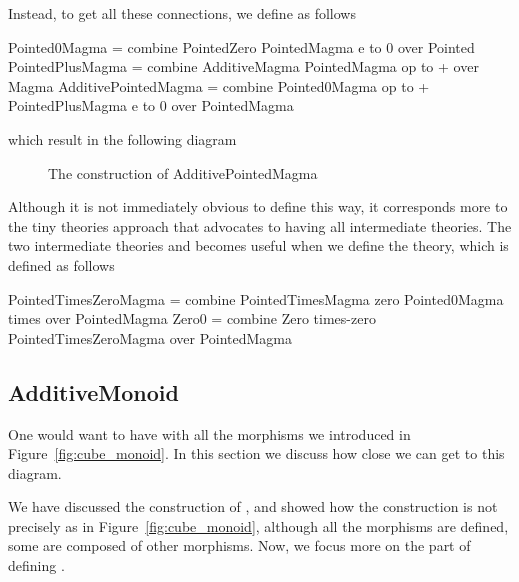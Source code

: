 Instead, to get all these connections, we define  as follows 
\begin{togcode}
Pointed0Magma = 
  combine PointedZero {} PointedMagma {e to 0} over Pointed
PointedPlusMagma = 
  combine AdditiveMagma {} PointedMagma {op to +} over Magma
AdditivePointedMagma = 
  combine Pointed0Magma {op to +} PointedPlusMagma {e to 0} 
  over PointedMagma
\end{togcode}
which result in the following diagram 
\begin{figure}[h]
    \caption{The construction of AdditivePointedMagma}
    \label{fig:addPointedMagmaReal}
\end{figure}
Although it is not immediately obvious to define  this way, it corresponds more to the tiny theories approach that advocates to having all intermediate theories. The two intermediate theories  and  becomes useful when we define the  theory, which is defined as follows 
\begin{togcode}
PointedTimesZeroMagma = 
  combine PointedTimesMagma zero Pointed0Magma times 
  over PointedMagma 
Zero0 = 
  combine Zero times-zero PointedTimesZeroMagma {} 
  over PointedMagma 
\end{togcode}

\subsection{AdditiveMonoid}
One would want to have  with all the morphisms we introduced in Figure~\ref{fig:cube_monoid}. In this section we discuss how close we can get to this diagram. 

We have discussed the construction of , and showed how the construction is not precisely as in Figure~\ref{fig:cube_monoid}, although all the morphisms are defined, some are composed of other morphisms. Now, we focus more on the part of defining . 

